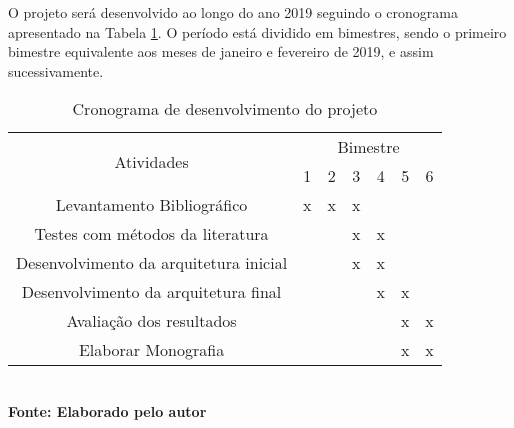 O projeto será desenvolvido ao longo do ano 2019 seguindo o cronograma apresentado na Tabela \ref{tab:tabela1}. O período está dividido em bimestres, sendo o primeiro bimestre equivalente aos meses de janeiro e fevereiro de 2019, e assim sucessivamente.

\begin{table}[H]
	\centering
	\caption[Cronograma de desenvolvimento]{Cronograma de desenvolvimento do projeto}
	\label{tab:tabela1}
	\begin{tabular}{|c|c|c|c|c|c|c|}
		\hline
		\multirow{2}{*}{Atividades}            & \multicolumn{6}{c|}{Bimestre} \\ \cline{2-7} 
		& 1   & 2   & 3  & 4  & 5  & 6  \\ \hline
		Levantamento Bibliográfico             & x   & x   & x  &    &    &    \\ \hline
		Testes com métodos da literatura       &     &     & x  & x  &    &    \\ \hline
		Desenvolvimento da arquitetura inicial &     &     & x  & x  &    &    \\ \hline
		Desenvolvimento da arquitetura final   &     &     &    & x  & x  &    \\ \hline
		Avaliação dos resultados               &     &     &    &    & x  & x  \\ \hline
		Elaborar Monografia                    &     &     &    &    & x  & x  \\ \hline
	\end{tabular}
	\vspace{0.1cm} 
	{\footnotesize\\ \textbf{Fonte: Elaborado pelo autor}}
\end{table}
